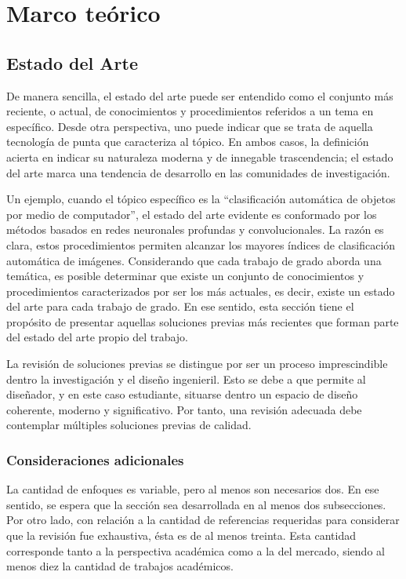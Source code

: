 \chapter{Marco teórico}
\label{sec:teoria}
\section{Estado del Arte }
De manera sencilla, el estado del arte puede ser entendido como el conjunto más reciente, o actual, de conocimientos y procedimientos referidos a un tema en específico. Desde otra perspectiva, uno puede indicar que se trata de aquella tecnología de punta que caracteriza al tópico. En ambos casos, la definición acierta en indicar su naturaleza moderna y de innegable trascendencia; el estado del arte marca una tendencia de desarrollo en las comunidades de investigación. 

Un ejemplo, cuando el tópico específico es la “clasificación automática de objetos por medio de computador”, el estado del arte evidente es conformado por los métodos basados en redes neuronales profundas y convolucionales. La razón es clara, estos procedimientos permiten alcanzar los mayores índices de clasificación automática de imágenes. 
Considerando que cada trabajo de grado aborda una temática, es posible determinar que existe un conjunto de conocimientos y procedimientos caracterizados por ser los más actuales, es decir, existe un estado del arte para cada trabajo de grado. En ese sentido, esta sección tiene el propósito de presentar aquellas soluciones previas más recientes que forman parte del estado del arte propio del trabajo. 

La revisión de soluciones previas se distingue por ser un proceso imprescindible dentro la investigación y el diseño ingenieril. Esto se debe a que permite al diseñador, y en este caso estudiante, situarse dentro un espacio de diseño coherente, moderno y significativo. Por tanto, una revisión adecuada debe contemplar múltiples soluciones previas de calidad. 

\subsection{Consideraciones adicionales}
La cantidad de enfoques es variable, pero al menos son necesarios dos. En ese sentido, se espera que la sección sea desarrollada en al menos dos subsecciones. Por otro lado, con relación a la cantidad de referencias requeridas para considerar que la revisión fue exhaustiva, ésta es de al menos treinta. Esta cantidad corresponde tanto a la perspectiva académica como a la del mercado, siendo al menos diez la cantidad de trabajos académicos.

